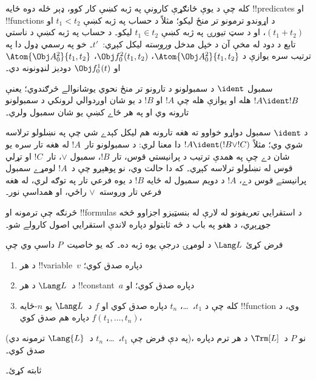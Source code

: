 \documentclass[../../../include/open-logic-section]{subfiles}
\begin{document}
کله چې د يوې ځانګړې کارونې په ژبه کښې کار کوو، ډېر ځله دوه ځايه
!!{predicate}s او !!{function}s د اړوندو ترمونو تر منځ ليکو؛ مثلاً د
حساب په ژبه کښې $t_1 < t_2$ او $(t_1 + t_2)$، او د سټ تيورۍ په ژبه
کښې $t_1 \in t_2$ ليکو۔ د حساب په ژبه کښې د ناستي تابع د دود له مخې
آن د خپل مدخل \emph{وروسته} ليکل کېږي:~$t'$۔ خو په رسمي ډول دا په
ترتيب سره يوازې د $\Atom{\Obj A^2_0}{t_1, t_2}$،
$\Obj f^2_0(t_1, t_2)$، $\Atom{\Obj A^2_0}{t_1, t_2}$ او
$\Obj f^1_0(t)$ دوديز لنډونونه دي۔

\begin{defn}
سمبول $\ident$ د سمبولونو د تارونو تر منځ نحوي يوشانوالے څرګندوي؛
يعنې $!A \ident !B$ هله او يوازې هله چې $!A$ او $!B$ د يو شان
اوږدوالي لرونکي د سمبولونو تارونه وي او په هر ځاے کښې يو شان سمبول
ولري۔
\end{defn}

د $\ident$ سمبول دواړو خواوو ته هغه تارونه هم ليکل کېدے شي چې په نښلولو
ترلاسه شوي وي؛ مثلاً $!A \ident (!B \lor !C)$ دا معنا لري: د
سمبولونو تار~$!A$ له هغه تار سره يو شان دے چې په همدې ترتيب د پرانيستي
قوس، تار $!B$، سمبول $\lor$، تار~$!C$ او تړلي قوس له نښلولو ترلاسه
کېږي۔ که دا حالت وي، نو پوهېږو چې د~$!A$ لومړے سمبول پرانيستے قوس
دے، $!A$ د دويم سمبول له ځايه $!B$ د يوه فرعي تار په توګه لري، له
هغه فرعي تار وروسته~$\lor$ راځي، او همداسې نور۔

څرنګه چې ترمونه او !!{formula}s د استقرايي تعريفونو له لارې له بنسټيزو
اجزاوو څخه جوړېږي، د هغو په باب د څه ثابتولو دپاره لاندې استقرايي
اصول کارولے شو۔

\begin{lem}
    فرض کړئ $\Lang L$ د لومړۍ درجې يوه ژبه ده۔
    که يو خاصيت~$P$ داسې وي چې
    \begin{enumerate}
        \item د هر !!{variable}~$v$ دپاره صدق کوي؛
        \item د~$\Lang L$ د هر !!{constant}~$a$ دپاره صدق کوي؛ او
        \item کله چې د $t_1$،~\dots، $t_n$ دپاره صدق کوي او $f$
        د~$\Lang L$ يو $n$-ځايه !!{function} وي، د
        $f(t_1,\dotsc,t_n)$ دپاره هم صدق کوي،
    \end{enumerate}
    (په دې فرض چې $t_1$،~\dots، $t_n$ د~$\Lang{L}$ ترمونه دي)،
    نو $P$ د~$\Trm[L]$ د هر ترم دپاره صدق کوي۔
\end{lem}

\begin{prob}
     ثابته کړئ۔
\end{prob}
\end{document}
